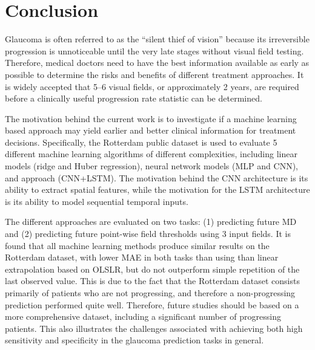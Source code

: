 \chapter{Conclusion}

Glaucoma is often referred to as the ``silent thief of vision'' because its irreversible progression is unnoticeable until the very late stages without visual field testing. Therefore, medical doctors need to have the best information available as early as possible to determine the risks and benefits of different treatment approaches. It is widely accepted that 5--6 visual fields, or approximately 2 years, are required before a clinically useful progression rate statistic can be determined. 

The motivation behind the current work is to investigate if a machine learning based approach may yield earlier and better clinical information for treatment decisions. Specifically, the Rotterdam public dataset is used to evaluate 5 different machine learning algorithms of different complexities, including linear models (ridge and Huber regression), neural network models (\acs{MLP} and \acs{CNN}), and  approach (\acs{CNN}+\acs{LSTM}). The motivation behind the \acs{CNN} architecture is its ability to extract spatial features, while the motivation for the \acs{LSTM} architecture is its ability to model sequential temporal inputs. 

The different approaches are evaluated on two tasks: (1) predicting future \ac{MD} and (2) predicting future point-wise field thresholds using 3 input fields. It is found that all machine learning methods produce similar results on the Rotterdam dataset, with lower \ac{MAE} in both tasks than using than linear extrapolation based on \acs{OLSLR}, but do not outperform simple repetition of the last observed value. This is due to the fact that the Rotterdam dataset consists primarily of patients who are not progressing, and therefore a non-progressing prediction performed quite well. Therefore, future studies should be based on a more comprehensive dataset, including a significant number of progressing patients. This also illustrates the challenges associated with achieving both high sensitivity and specificity in the glaucoma prediction tasks in general. 
